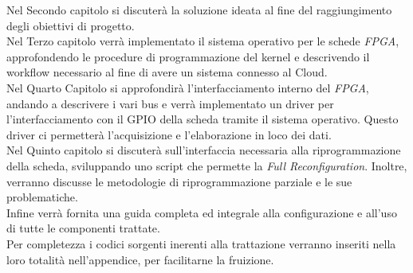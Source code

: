 Nel Secondo capitolo si discuterà la soluzione ideata al fine del raggiungimento degli obiettivi di progetto.\\
Nel Terzo capitolo verrà implementato il sistema operativo per le schede \textit{FPGA}, approfondendo le procedure di programmazione del kernel e descrivendo il workflow necessario al fine di avere un sistema connesso al Cloud.\\
Nel Quarto Capitolo si approfondirà l'interfacciamento interno del \textit{FPGA}, andando a descrivere i vari bus e verrà implementato un driver per l'interfacciamento con il GPIO della scheda tramite il sistema operativo. Questo driver ci permetterà l'acquisizione e l'elaborazione in loco dei dati.\\
Nel Quinto capitolo si discuterà sull'interfaccia necessaria alla riprogrammazione della scheda, sviluppando uno script che permette la \textit{Full Reconfiguration}. Inoltre, verranno discusse le metodologie di riprogrammazione parziale e le sue problematiche.\\
Infine verrà fornita una guida completa ed integrale alla configurazione e all'uso di tutte le componenti trattate.\\
Per completezza i codici sorgenti inerenti alla trattazione verranno inseriti nella loro totalità nell'appendice, per facilitarne la fruizione.